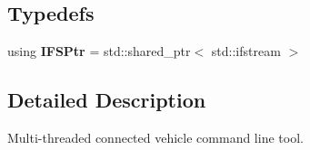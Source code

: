 \subsection*{Typedefs}
\begin{DoxyCompactItemize}
\item 
using {\bfseries I\+F\+S\+Ptr} = std\+::shared\+\_\+ptr$<$ std\+::ifstream $>$\hypertarget{namespacecvdi__multi_a41b0789bb00374b4509aae640310e52f}{}\label{namespacecvdi__multi_a41b0789bb00374b4509aae640310e52f}

\end{DoxyCompactItemize}


\subsection{Detailed Description}
Multi-\/threaded connected vehicle command line tool. 